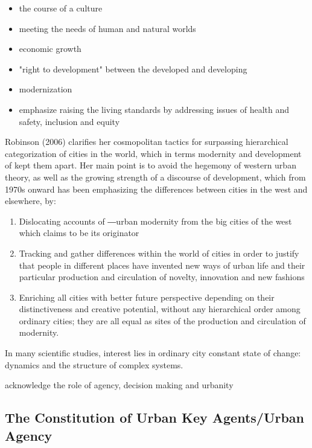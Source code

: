 \documentclass[11pt]{report}
\begin{document}
\begin{itemize}
\item the course of a culture
\item meeting the needs of human and natural worlds
\item economic growth
\item "right to development" between the developed and developing
\item modernization
\item emphasize raising the living standards by addressing issues of health and safety, inclusion and equity
\end{itemize}  
Robinson (2006) clarifies   her  cosmopolitan  tactics  for  surpassing  hierarchical categorization of cities in the world, which in terms modernity and development of kept them apart. Her main point is to avoid the hegemony of western urban theory, as  well as the growing  strength of a discourse of development, which from 1970s onward has been emphasizing the differences between cities in the west and elsewhere, by: 
\begin{enumerate}

\subsubsection{An Urban Development Process in an Ordinary City}

\item Dislocating accounts of ―urban modernity from the big cities of the west which claims to be its 
originator
\item Tracking  and  gather  differences  within  the  world  of  cities  in  order  to  justify  that  people  in different  places  have  invented  new  ways  of  urban  life  and  their  particular  production  and circulation of novelty, innovation and new fashions
\item Enriching  all  cities  with  better  future  perspective  depending  on  their  distinctiveness  and creative potential, without any hierarchical order among ordinary cities; they are all equal as 
sites of the production and circulation of modernity.
\end{enumerate}
In many scientific studies, interest lies in ordinary city constant state of change: dynamics and the structure of complex systems.

acknowledge the role of agency, decision making and urbanity

\subsection{The Constitution of Urban Key Agents/Urban Agency}
\end{document}
